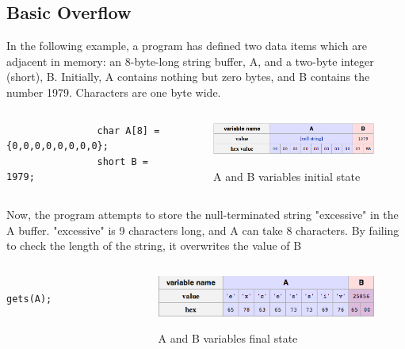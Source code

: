 \subsection{Basic Overflow}
	In the following example, a program has defined two data items which are adjacent in memory: an 8-byte-long string buffer, A, and a two-byte integer (short), B. Initially, A contains nothing but zero bytes, and B contains the number 1979. Characters are one byte wide.
	\begin{columns}[T]
		\begin{column}{.4\textwidth}
			\ccode
			\begin{lstlisting}
				char A[8] = {0,0,0,0,0,0,0,0};
				short B = 1979;
			\end{lstlisting}
		\end{column}
		\begin{column}{.6\textwidth}
			\begin{figure}
			\includegraphics[width=\textwidth]{imgs/initialAB.png}
			\label{fig:initialAB}
			\caption{A and B variables initial state}			
			\end{figure}
		\end{column}
	\end{columns}
\framebreak
	Now, the program attempts to store the null-terminated string "excessive" in the A buffer. "excessive" is 9 characters long, and A can take 8 characters. By failing to check the length of the string, it overwrites the value of B
	\begin{columns}[T]
		\begin{column}{.4\textwidth}
			\ccode
			\begin{lstlisting}
				gets(A);
			\end{lstlisting}
		\end{column}
		\begin{column}{.6\textwidth}
			\begin{figure}
			\includegraphics[width=\textwidth]{imgs/finalAB.png}
			\label{fig:finalAB}
			\caption{A and B variables final state}
			\end{figure}
		\end{column}
	\end{columns}
